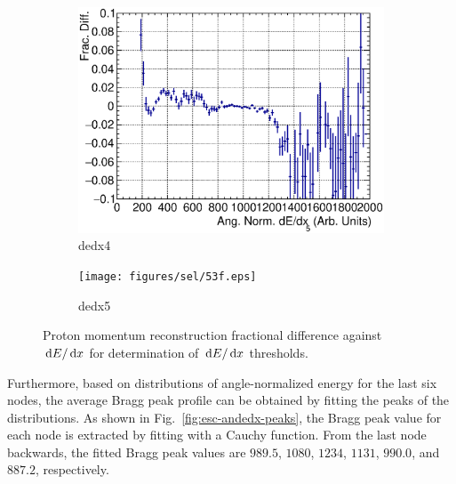 \begin{figure}[t]
      \\
      \begin{subfigure}{\dbfigwid\textwidth}
           \includegraphics[width=\textwidth]{figures/sel/fig53e.eps}
           \caption{dedx4}
           \label{subfig:dedx4}
      \end{subfigure}
      \begin{subfigure}{\dbfigwid\textwidth}
           \texttt{[image: figures/sel/53f.eps]}
           \caption{dedx5}
           \label{subfig:dedx5}
      \end{subfigure}
      \caption{Proton momentum reconstruction fractional difference against $\,\textrm{d}E/\,\textrm{d}x$ for determination of $\,\textrm{d}E/\,\textrm{d}x$ thresholds.}
      \label{fig:esc-andedx-slice}
  \end{figure}

     Furthermore, based on distributions of angle-normalized energy for the last six nodes, the average Bragg peak profile can be obtained by fitting the peaks of the distributions.
     As shown in Fig.~\ref{fig:esc-andedx-peaks}, the Bragg peak value for each node is extracted by fitting with a Cauchy function.
     From the last node backwards, the fitted Bragg peak values are $989.5$, $1080$, $1234$, $1131$, $990.0$, and $887.2$, respectively.


